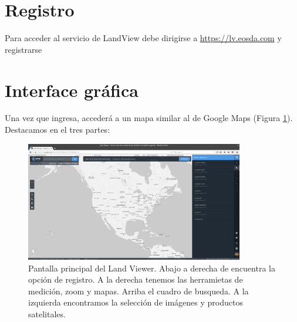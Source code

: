 \documentclass[a4paper,12pt]{book}
\begin{document}
\section{Registro}
Para acceder al servicio de LandView debe dirigirse a \url{https://lv.eosda.com} y registrarse

\section{Interface gráfica}

Una vez que ingresa, accederá a un mapa  similar al de Google Maps (Figura \ref{fig:main}). %
Destacamos en el tres partes:

\begin{figure}[hb!]
    \centering
    \includegraphics[width=0.85\textwidth]{fig:main.png}
    \caption{Pantalla principal del Land Viewer. Abajo a derecha de encuentra la opción de registro. A la derecha tenemos las herramietas de medición, zoom y mapas. Arriba el cuadro de busqueda. A la izquierda encontramos la selección de imágenes y productos satelitales.}
    \label{fig:main}
\end{figure}
\end{document}
